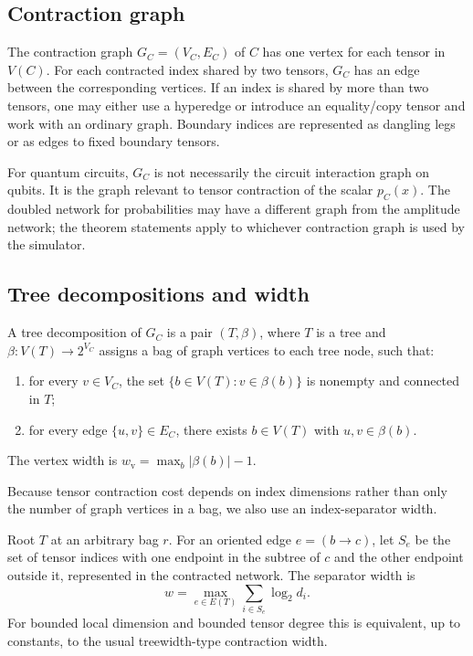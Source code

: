 \subsection{Contraction graph}

\begin{definition}
The contraction graph \(G_C=(V_C,E_C)\) of \(C\) has one vertex for each tensor in \(V(C)\). For each contracted index shared by two tensors, \(G_C\) has an edge between the corresponding vertices. If an index is shared by more than two tensors, one may either use a hyperedge or introduce an equality/copy tensor and work with an ordinary graph. Boundary indices are represented as dangling legs or as edges to fixed boundary tensors.
\end{definition}

For quantum circuits, \(G_C\) is not necessarily the circuit interaction graph on qubits. It is the graph relevant to tensor contraction of the scalar \(p_C(x)\). The doubled network for probabilities may have a different graph from the amplitude network; the theorem statements apply to whichever contraction graph is used by the simulator.

\subsection{Tree decompositions and width}

\begin{definition}
A tree decomposition of \(G_C\) is a pair \((T,\beta)\), where \(T\) is a tree and \(\beta:V(T)\to 2^{V_C}\) assigns a bag of graph vertices to each tree node, such that:
\begin{enumerate}[leftmargin=1.2cm]
\item for every \(v\in V_C\), the set \(\{b\in V(T):v\in\beta(b)\}\) is nonempty and connected in \(T\);
\item for every edge \(\{u,v\}\in E_C\), there exists \(b\in V(T)\) with \(u,v\in\beta(b)\).
\end{enumerate}
The vertex width is \(w_{\mathrm{v}}=\max_b |\beta(b)|-1\).
\end{definition}

Because tensor contraction cost depends on index dimensions rather than only the number of graph vertices in a bag, we also use an index-separator width.

\begin{definition}
Root \(T\) at an arbitrary bag \(r\). For an oriented edge \(e=(b\to c)\), let \(S_e\) be the set of tensor indices with one endpoint in the subtree of \(c\) and the other endpoint outside it, represented in the contracted network. The separator width is
\[
w=\max_{e\in E(T)} \sum_{i\in S_e}\log_2 d_i .
\]
For bounded local dimension and bounded tensor degree this is equivalent, up to constants, to the usual treewidth-type contraction width.
\end{definition}

